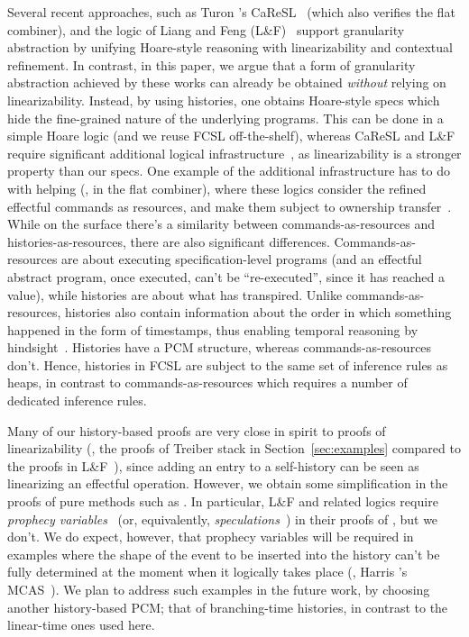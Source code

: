 Several recent approaches, such as Turon \etal's
CaReSL~\cite{Turon-al:ICFP13} (which also verifies the flat combiner),
and the logic of Liang and Feng (L\&F)~\cite{Liang-Feng:PLDI13}
support granularity abstraction by unifying Hoare-style reasoning with
linearizability and contextual refinement. 
%
%
In contrast, in this paper, we argue that a form of granularity
abstraction achieved by these works can already be obtained
\emph{without} relying on linearizability. Instead, by using
histories, one obtains Hoare-style specs which hide the fine-grained
nature of the underlying programs. This can be done in a simple Hoare
logic (and we reuse FCSL off-the-shelf), whereas CaReSL and L\&F
require significant additional logical
infrastructure~\cite{Liang-al:POPL12,Turon-al:POPL13}, as
linearizability is a stronger property than our specs. One example of
the additional infrastructure has to do with helping (\eg, in the flat
combiner), where these logics consider the refined effectful commands
as resources, and make them subject to ownership
transfer~\cite{Turon-al:ICFP13}.
% 
While on the surface there's a similarity between
commands-as-resources and histories-as-resources, there are also
significant differences. Commands-as-resources are about executing
specification-level programs (and an effectful abstract program, once
executed, can't be ``re-executed'', since it has reached a value),
while histories are about what has transpired. Unlike
commands-as-resources, histories also contain information about the
order in which something happened in the form of timestamps, thus
enabling temporal reasoning by
hindsight~\cite{OHearn-al:PODC10}. Histories have a PCM structure,
whereas commands-as-resources don't. Hence, histories in FCSL are
subject to the same set of inference rules as heaps, in contrast to
commands-as-resources which requires a number of dedicated inference
rules.


Many of our history-based proofs are very close in spirit to proofs of
linearizability (\eg, the proofs of Treiber stack in
Section~\ref{sec:examples} compared to the proofs in
L\&F~\cite{Liang-Feng:PLDI13}), since adding an entry to a self-history
can be seen as linearizing an effectful operation.
%
However, we obtain some simplification in the proofs of pure methods
such as . In particular, L\&F and related logics require
\emph{prophecy variables}~\cite{Qadeer-al:TR09} (or, equivalently,
\emph{speculations}~\cite{Liang-Feng:PLDI13,Turon-al:POPL13}) in their
proofs of , but we don't.
%
We do expect, however, that prophecy variables will be required in
examples where the shape of the event to be inserted into the history
can't be fully determined at the moment when it logically takes place
(\eg, Harris \etal's MCAS~\cite{Vafeiadis:PhD}). We plan to address
such examples in the future work, by choosing another history-based
PCM; that of branching-time histories, in contrast to the linear-time
ones used here.
 
